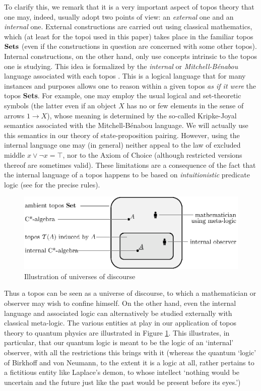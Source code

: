 \documentclass[11pt]{article}
\newcommand{\Sets}{\mbox{\textbf{Sets}}}
\newcommand{\raw}{\rightarrow} \newcommand{\rat}{\mapsto}
\begin{document}
To clarify this, we remark that
it is a very important aspect of topos theory that one may, indeed,  usually
adopt two
points of view: an {\it external} one and an {\it internal} one. External
constructions are carried out using classical mathematics, which (at
least for the topoi used in this paper) takes place in the familiar
topos $\Sets$ (even if the constructions in question are concerned with some
other
topos). Internal constructions, on the other hand, only use concepts
intrinsic to the topos one is studying. This idea is formalized by the {\it
internal}
or {\it Mitchell-B{\'e}nabou} language associated with each topos
\cite{borceux3,johnstone02b,maclanemoerdijk92}. This is a logical language that
for many instances and purposes allows one to reason within a given topos {\it
as if it were} the topos \Sets. For example,
one may employ the usual logical and set-theoretic symbols (the latter even if
an object $X$ has no or few elements in the sense of arrows $1\raw X$), whose
meaning is determined by the so-called Kripke-Joyal semantics associated with
the Mitchell-B{\'e}nabou language. We will actually use this semantics
in our theory of state-proposition pairing. However, using the
internal language one may (in general) neither appeal to the law of
excluded middle $x\vee\neg x=\top$, nor to the Axiom of Choice
(although restricted versions thereof are sometimes valid). These
limitations are a consequence of the fact that the internal language
of a topos happens to be based on {\it intuitionistic} predicate logic
(see  \cite{borceux3,johnstone02b} for the precise rules).
\begin{center}
\begin{figure}
  \includegraphics{picture}
  \caption{Illustration of  universes of discourse}
  \label{fig:toposlevels}
\end{figure}
\end{center}

Thus a topos can be seen as a universe of discourse, to which a  mathematician
or
observer may wish  to confine himself. On the other hand, even the internal
language and associated logic  can alternatively be studied externally with
classical
meta-logic. The various entities at play in our application of topos theory to
quantum physics are illustrated in Figure \ref{fig:toposlevels}. This
illustrates, in particular, that our quantum logic is meant to be the logic of
an `internal' observer, with all the restrictions this brings with it (whereas
the quantum `logic' of Birkhoff and von Neumann, to the extent it is a logic at
all, rather pertains to a fictitious entity like
Laplace's demon, to whose intellect `nothing would be uncertain and the future
just like the past would be present before its eyes.')
\end{document}
